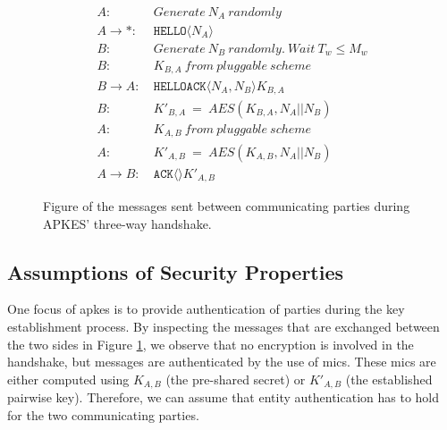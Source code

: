 \begin{figure}[h]
\begin{tcolorbox}[title=Three-way handshake in APKES]
\begin{align*}
A:\ & Generate\ N_A\ randomly\\
A \rightarrow *:\ & \texttt{HELLO}\langle{N_A}\rangle{}\\
B:\ & Generate\ N_B\ randomly.\ Wait\ T_w \leq M_w\\
B:\ & K_{B,A}\ from\ pluggable\ scheme\\
B \rightarrow A:\ & \texttt{HELLOACK}\langle{N_A, N_B}\rangle{K_{B,A}}\\
B:\ & K'_{B,A}\ =\ AES(K_{B,A}, N_A || N_B)\\
A:\ & K_{A,B}\ from\ pluggable\ scheme\\
A:\ & K'_{A,B}\ =\ AES(K_{A,B}, N_A || N_B)\\
A \rightarrow B:\ & \texttt{ACK}\langle{}\rangle{K'_{A,B}}
\end{align*}
\end{tcolorbox}
\caption{Figure of the messages sent between communicating parties during APKES' three-way handshake.}
\label{fig:apkes-handshake}
\end{figure}

\subsection{Assumptions of Security Properties}
\label{subsec:apkes-prop}

One focus of \gls{apkes} is to provide authentication of parties during the key establishment process. By inspecting the messages that are exchanged between the two sides in Figure \ref{fig:apkes-handshake}, we observe that no encryption is involved in the handshake, but messages are authenticated by the use of \gls{mic}s. These \gls{mic}s are either computed using $K_{A,B}$ (the pre-shared secret) or $K'_{A,B}$ (the established pairwise key). Therefore, we can assume that entity authentication has to hold for the two communicating parties.

